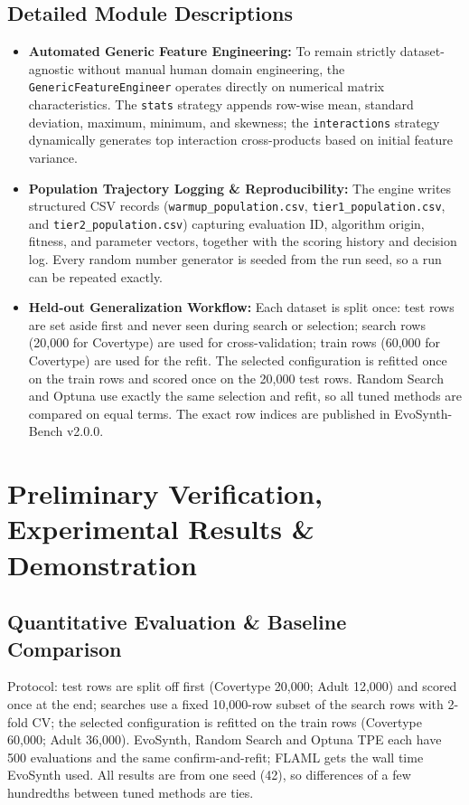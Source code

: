 \documentclass[11pt, a4paper]{article}
\begin{document}
\subsection{Detailed Module Descriptions}
\begin{itemize}[noitemsep, topsep=2pt]
    \item \textbf{Automated Generic Feature Engineering:} To remain strictly dataset-agnostic without manual human domain engineering, the \texttt{GenericFeatureEngineer} operates directly on numerical matrix characteristics. The \texttt{stats} strategy appends row-wise mean, standard deviation, maximum, minimum, and skewness; the \texttt{interactions} strategy dynamically generates top interaction cross-products based on initial feature variance.
    \item \textbf{Population Trajectory Logging \& Reproducibility:} The engine writes structured CSV records (\texttt{warmup\_population.csv}, \texttt{tier1\_population.csv}, and \texttt{tier2\_population.csv}) capturing evaluation ID, algorithm origin, fitness, and parameter vectors, together with the scoring history and decision log. Every random number generator is seeded from the run seed, so a run can be repeated exactly.
    \item \textbf{Held-out Generalization Workflow:} Each dataset is split once: test rows are set aside first and never seen during search or selection; search rows (20,000 for Covertype) are used for cross-validation; train rows (60,000 for Covertype) are used for the refit. The selected configuration is refitted once on the train rows and scored once on the 20,000 test rows. Random Search and Optuna use exactly the same selection and refit, so all tuned methods are compared on equal terms. The exact row indices are published in EvoSynth-Bench v2.0.0.
\end{itemize}

\section{Preliminary Verification, Experimental Results \& Demonstration}

\subsection{Quantitative Evaluation \& Baseline Comparison}
\noindent
Protocol: test rows are split off first (Covertype 20,000; Adult 12,000) and scored once at the end; searches use a fixed 10,000-row subset of the search rows with 2-fold CV; the selected configuration is refitted on the train rows (Covertype 60,000; Adult 36,000). EvoSynth, Random Search and Optuna TPE each have 500 evaluations and the same confirm-and-refit; FLAML gets the wall time EvoSynth used. All results are from one seed (42), so differences of a few hundredths between tuned methods are ties.
\end{document}
